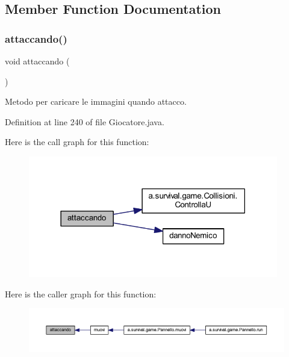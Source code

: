 \subsection{Member Function Documentation}
\mbox{\label{class_entita_1_1_giocatore_af4bcd86c7ccc1775a5fece50849563fe}} 
\subsubsection{\texorpdfstring{attaccando()}{attaccando()}}
{\footnotesize\ttfamily void attaccando (\begin{DoxyParamCaption}{ }\end{DoxyParamCaption})\hspace{0.3cm}{\ttfamily [private]}}



Metodo per caricare le immagini quando attacco. 



Definition at line 240 of file Giocatore.\+java.

Here is the call graph for this function\+:
\nopagebreak
\begin{figure}[H]
\begin{center}
\leavevmode
\includegraphics[width=309pt]{class_entita_1_1_giocatore_af4bcd86c7ccc1775a5fece50849563fe_cgraph}
\end{center}
\end{figure}
Here is the caller graph for this function\+:
\nopagebreak
\begin{figure}[H]
\begin{center}
\leavevmode
\includegraphics[width=350pt]{class_entita_1_1_giocatore_af4bcd86c7ccc1775a5fece50849563fe_icgraph}
\end{center}
\end{figure}
\mbox{\label{class_entita_1_1_giocatore_a867fc5532a9f20042ecde7951b83c499}} 

